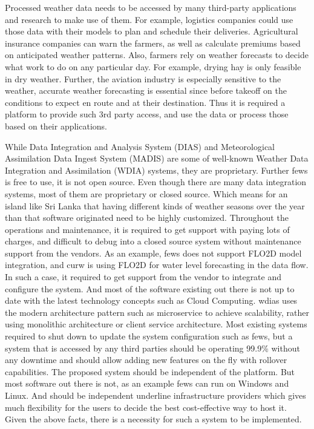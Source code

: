 Processed weather data needs to be accessed by many third-party applications and research to make use of them. For example, logistics companies could use those data with their models to plan and schedule their deliveries. Agricultural insurance companies can warn the farmers, as well as calculate premiums based on anticipated weather patterns. Also, farmers rely on weather forecasts to decide what work to do on any particular day. For example, drying hay is only feasible in dry weather. Further, the aviation industry is especially sensitive to the weather, accurate weather forecasting is essential since before takeoff on the conditions to expect en route and at their destination. 
Thus it is required a platform to provide such 3rd party access, and use the data or process those based on their applications.

While Data Integration and Analysis System (DIAS) \cite{Kawasaki2018DataReduction} and Meteorological Assimilation Data Ingest System (MADIS) \cite{Macdermaid2005ARCHITECTUREP2.39} are some of well-known Weather Data Integration and Assimilation (WDIA) systems, they are proprietary. Further \acrfull{fews} \cite{Werner2013TheSystem} is free to use, it is not open source.
Even though there are many data integration systems, most of them are proprietary or closed source. Which means for an island like Sri Lanka that having different kinds of weather seasons over the year than that software originated need to be highly customized. Throughout the operations and maintenance, it is required to get support with paying lots of charges, and difficult to debug into a closed source system without maintenance support from the vendors. As an example, \acrshort{fews} does not support FLO2D model integration, and \acrshort{curw} is using FLO2D for water level forecasting in the data flow. In such a case, it required to get support from the vendor to integrate and configure the system.
And most of the software existing out there is not up to date with the latest technology concepts such as Cloud Computing. \acrfull{wdias} uses the modern architecture pattern such as microservice to achieve scalability, rather using monolithic architecture or client service architecture. Most existing systems required to shut down to update the system configuration such as \acrshort{fews}, but a system that is accessed by any third parties should be operating 99.9\% without any downtime and should allow adding new features on the fly with rollover capabilities. The proposed system should be independent of the platform. But most software out there is not, as an example \acrshort{fews} can run on Windows and Linux. And should be independent underline infrastructure providers which gives much flexibility for the users to decide the best cost-effective way to host it. Given the above facts, there is a necessity for such a system to be implemented.

